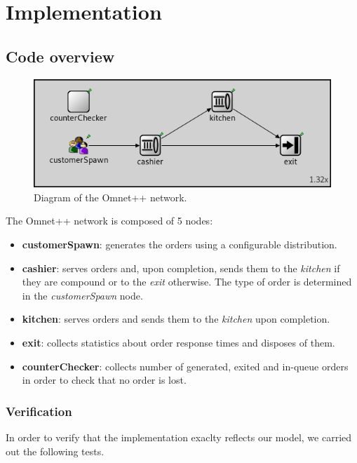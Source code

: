 \section{Implementation}

\subsection{Code overview}

\begin{figure}[h!]
    \centering
    \includegraphics[width=.75\textwidth]{figs/omnet_network.png}
    \caption{Diagram of the Omnet++ network.}
    \label{fig:omnet_network}
\end{figure}

The Omnet++ network is composed of 5 nodes:
\begin{itemize}
    \item \textbf{customerSpawn}: generates the orders using a configurable
        distribution.
    \item \textbf{cashier}: serves orders and, upon completion, sends them to 
        the \emph{kitchen} if they are compound or to the \emph{exit} otherwise.
        The type of order is determined in the \emph{customerSpawn} node.
    \item \textbf{kitchen}: serves orders and sends them to the \emph{kitchen}
        upon completion.
    \item \textbf{exit}: collects statistics about order response times and 
        disposes of them.
    \item \textbf{counterChecker}: collects number of generated, exited and 
        in-queue orders in order to check that no order is lost.
\end{itemize}


\subsubsection{Verification}
In order to verify that the implementation exaclty reflects our model, we 
carried out the following tests.

